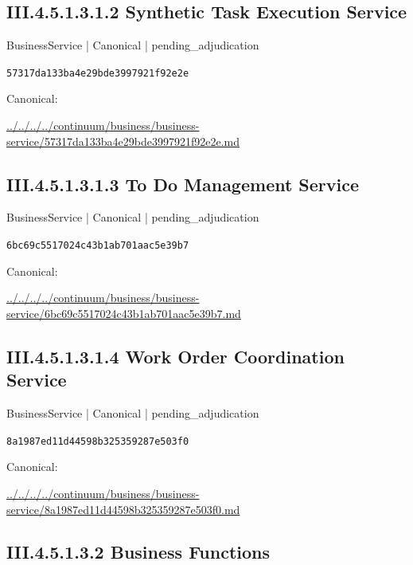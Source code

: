 \documentclass[10pt,a4paper]{article}
\begin{document}
\subsection*{III.4.5.1.3.1.2 Synthetic Task Execution Service}
\label{element-57317da133ba4e29bde3997921f92e2e}
{\small BusinessService | Canonical | pending\_adjudication}\par
\texttt{57317da133ba4e29bde3997921f92e2e}\par
Canonical: \par
{\footnotesize\url{../../../../continuum/business/business-service/57317da133ba4e29bde3997921f92e2e.md}}\par
\subsection*{III.4.5.1.3.1.3 To Do Management Service}
\label{element-6bc69c5517024c43b1ab701aac5e39b7}
{\small BusinessService | Canonical | pending\_adjudication}\par
\texttt{6bc69c5517024c43b1ab701aac5e39b7}\par
Canonical: \par
{\footnotesize\url{../../../../continuum/business/business-service/6bc69c5517024c43b1ab701aac5e39b7.md}}\par
\subsection*{III.4.5.1.3.1.4 Work Order Coordination Service}
\label{element-8a1987ed11d44598b325359287e503f0}
{\small BusinessService | Canonical | pending\_adjudication}\par
\texttt{8a1987ed11d44598b325359287e503f0}\par
Canonical: \par
{\footnotesize\url{../../../../continuum/business/business-service/8a1987ed11d44598b325359287e503f0.md}}\par
\subsection*{III.4.5.1.3.2 Business Functions}
\end{document}
